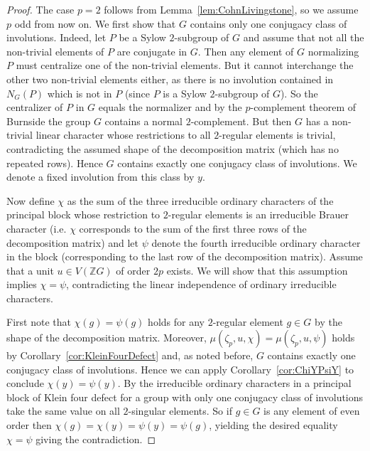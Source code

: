 \documentclass[11pt, a4paper]{amsart}
\theoremstyle{definition}
\theoremstyle{definition}
\begin{document}
\begin{proof}
The case $p=2$ follows from Lemma~\ref{lem:CohnLivingstone}, so we assume $p$ odd from now on.
We first show that $G$ contains only one conjugacy class of involutions. Indeed, let $P$ be a Sylow $2$-subgroup of $G$ and assume that not all the non-trivial elements of $P$ are conjugate in $G$. Then any element of $G$ normalizing $P$ must centralize one of the non-trivial elements. But it  cannot interchange the other two non-trivial elements either, as there is no involution contained in $N_G(P)$ which is not in $P$ (since $P$ is a Sylow $2$-subgroup of $G$). So the centralizer of $P$ in $G$ equals the normalizer and by the $p$-complement theorem of Burnside \cite[IV, Hauptsatz 2.6]{HuppertI} the group $G$ contains a normal $2$-complement. But then $G$ has a non-trivial linear character whose restrictions to all $2$-regular elements is trivial, contradicting the assumed shape of the decomposition matrix (which has no repeated rows). Hence $G$ contains exactly one conjugacy class of involutions. We denote a fixed involution from this class by $y$.

Now define $\chi$ as the sum of the three irreducible ordinary characters of the principal block whose restriction to $2$-regular elements is an irreducible Brauer character (i.e. $\chi$ corresponds to the sum of the first three rows of the decomposition matrix) and let $\psi$ denote the fourth irreducible ordinary character in the block (corresponding to the last row of the decomposition matrix). Assume that a unit $u \in V(\mathbb{Z}G)$ of order $2p$ exists. We will show that this assumption implies $\chi = \psi$, contradicting the linear independence of ordinary irreducible characters.

First note that $\chi(g) = \psi(g)$ holds for any $2$-regular element $g \in G$ by the shape of the decomposition matrix. 
Moreover, $\mu(\zeta_p, u, \chi) = \mu(\zeta_p, u, \psi)$ holds by Corollary~\ref{cor:KleinFourDefect} and, as noted before, $G$ contains exactly one conjugacy class of involutions. Hence we can apply Corollary~\ref{cor:ChiYPsiY} to conclude $\chi(y) = \psi(y)$. By \cite[Theorem 7.7]{Navarro} the irreducible ordinary characters in a principal block of Klein four defect for a group with only one conjugacy class of involutions take the same value on all $2$-singular elements. So if $g \in G$ is any element of even order then 
$\chi(g) = \chi(y) = \psi(y) = \psi(g)$, yielding the desired equality $\chi = \psi$ giving the contradiction.
\end{proof}
\end{document}
